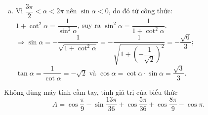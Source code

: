 \begin{vd}
{\begin{enumerate}[a)]
			$\Rightarrow\cos\alpha=-\dfrac{1}{\sqrt{1+\tan^2\alpha}}=-\dfrac{1}{\sqrt{1+(\sqrt{5})^2}}=-\dfrac{\sqrt{6}}{6}$;\\ $\cot\alpha=\dfrac{1}{\tan\alpha}=\dfrac{\sqrt{5}}{5}$ và $\sin\alpha=\tan\alpha\cdot\cos\alpha=-\dfrac{\sqrt{30}}{6}$.
			\item 
			Vì $\dfrac{3\pi}{2}<\alpha<2\pi$ nên $\sin\alpha<0$, do đó từ công thức:\\
			$1+\cot^2\alpha=\dfrac{1}{\sin^2\alpha}$, suy ra $\sin^2\alpha=\dfrac{1}{1+\cot^2\alpha}$.\\
			$\Rightarrow\sin\alpha=-\dfrac{1}{\sqrt{1+\cot^2\alpha}}=-\dfrac{1}{\sqrt{1+\left(-\dfrac{1}{\sqrt{2}}\right)^2}}=-\dfrac{\sqrt{6}}{3}$;\\ $\tan\alpha=\dfrac{1}{\cot\alpha}=-\sqrt{2}$ và $\cos\alpha=\cot\alpha\cdot\sin\alpha=\dfrac{\sqrt{3}}{3}$.
		\end{enumerate}
	}
\end{vd}

\begin{vd}%
	Không dùng máy tính cầm tay, tính giá trị của biểu thức
	\[A=\cos \dfrac{\pi}{9}-\sin \dfrac{13\pi}{36}+\cos \dfrac{5\pi}{36}+\cos \dfrac{8\pi}{9}-\cos \pi.\]
\end{vd}


